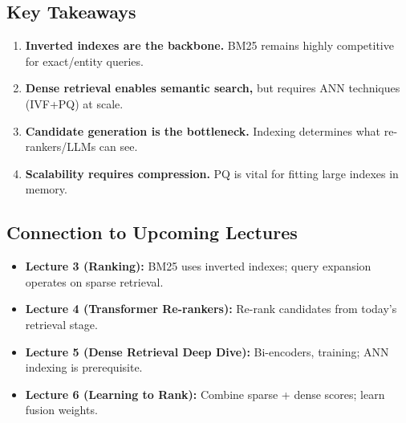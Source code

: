 \documentclass[11pt,a4paper]{article}
\theoremstyle{definition}
\theoremstyle{plain}
\begin{document}
\subsection{Key Takeaways}

\begin{enumerate}
    \item \textbf{Inverted indexes are the backbone.} BM25 remains highly competitive for exact/entity queries.
    \item \textbf{Dense retrieval enables semantic search,} but requires ANN techniques (IVF+PQ) at scale.
    \item \textbf{Candidate generation is the bottleneck.} Indexing determines what re-rankers/LLMs can see.
    \item \textbf{Scalability requires compression.} PQ is vital for fitting large indexes in memory.
\end{enumerate}

\subsection{Connection to Upcoming Lectures}

\begin{itemize}[nosep]
    \item \textbf{Lecture 3 (Ranking):} BM25 uses inverted indexes; query expansion operates on sparse retrieval.
    \item \textbf{Lecture 4 (Transformer Re-rankers):} Re-rank candidates from today's retrieval stage.
    \item \textbf{Lecture 5 (Dense Retrieval Deep Dive):} Bi-encoders, training; ANN indexing is prerequisite.
    \item \textbf{Lecture 6 (Learning to Rank):} Combine sparse + dense scores; learn fusion weights.
\end{itemize}



\end{document}
